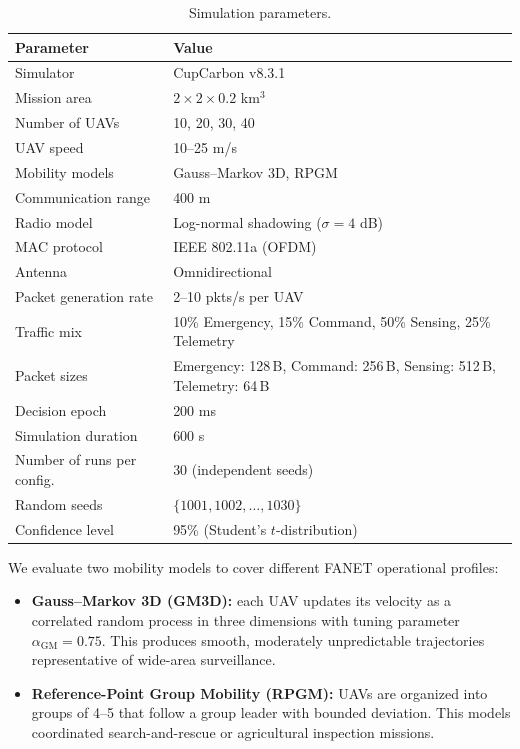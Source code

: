 \documentclass[5p,times]{elsarticle}
\begin{document}
\begin{table}[t]
\centering
\caption{Simulation parameters.}
\label{tab:parameters}
\scriptsize
\begin{tabular}{p{3.5cm}p{3.5cm}}
\toprule
Parameter & Value \\
\midrule
Simulator & CupCarbon v8.3.1 \\
Mission area & $2 \times 2 \times 0.2$ km$^3$ \\
Number of UAVs & 10, 20, 30, 40 \\
UAV speed & 10--25 m/s \\
Mobility models & Gauss--Markov 3D, RPGM \\
Communication range & 400 m \\
Radio model & Log-normal shadowing ($\sigma = 4$ dB) \\
MAC protocol & IEEE 802.11a (OFDM) \\
Antenna & Omnidirectional \\
Packet generation rate & 2--10 pkts/s per UAV \\
Traffic mix & 10\% Emergency, 15\% Command, 50\% Sensing, 25\% Telemetry \\
Packet sizes & Emergency: 128\,B, Command: 256\,B, Sensing: 512\,B, Telemetry: 64\,B \\
Decision epoch & 200 ms \\
Simulation duration & 600 s \\
Number of runs per config. & 30 (independent seeds) \\
Random seeds & $\{1001, 1002, \dots, 1030\}$ \\
Confidence level & 95\% (Student's $t$-distribution) \\
\bottomrule
\end{tabular}
\end{table}

We evaluate two mobility models to cover different FANET operational profiles:

\begin{itemize}
\item \textbf{Gauss--Markov 3D (GM3D):} each UAV updates its velocity as a correlated random process in three dimensions with tuning parameter $\alpha_{\mathrm{GM}} = 0.75$. This produces smooth, moderately unpredictable trajectories representative of wide-area surveillance.

\item \textbf{Reference-Point Group Mobility (RPGM):} UAVs are organized into groups of 4--5 that follow a group leader with bounded deviation. This models coordinated search-and-rescue or agricultural inspection missions.
\end{itemize}
\end{document}
